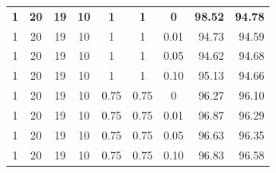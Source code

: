 \begin{table}[H]
\begin{tabular}{cccccccrr}
	\textbf{1}  & \textbf{20}     	& \textbf{19}	& \textbf{10}		& \textbf{1}			& \textbf{1}      		& \textbf{0}      		& \textbf{98.52} 		& \textbf{94.78}\\ 
	1      		& 20     			& 19     		& 10     			& 1      				& 1      				& 0.01    				& 94.73    				& 94.59\\ 
	1      		& 20     			& 19     		& 10     			& 1      				& 1      				& 0.05    				& 94.62    				& 94.68\\
	1      		& 20     			& 19     		& 10     			& 1      				& 1      				& 0.10    				& 95.13    				& 94.66\\
	1      		& 20     			& 19     		& 10     			& 0.75      			& 0.75      			& 0	    				& 96.27    				& 96.10\\
	1      		& 20     			& 19     		& 10     			& 0.75      			& 0.75      			& 0.01    				& 96.87    				& 96.29\\
	1      		& 20     			& 19     		& 10     			& 0.75      			& 0.75      			& 0.05    				& 96.63    				& 96.35\\
	1      		& 20     			& 19     		& 10     			& 0.75      			& 0.75      			& 0.10    				& 96.83    				& 96.58\\
    \bottomrule
  \end{tabular}
\end{table}

